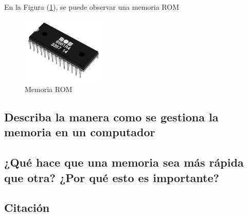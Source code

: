 \documentclass{article}
\begin{document}
\begin{itemize}
    En la Figura (\ref{fig:rom}), se puede observar una memoria ROM
     \begin{figure}[h]
    \includegraphics[width=4cm]{rom.png}
    \centering
    \caption{Memoria ROM}
    \label{fig:rom}
    \end{figure}
    
    
\end{itemize}


\subsection{Describa la manera como se gestiona la memoria en un computador}


\subsection{¿Qué hace que una memoria sea más rápida que otra? ¿Por qué esto es importante?}
 \subsection{ Citación}
 













\end{document}
